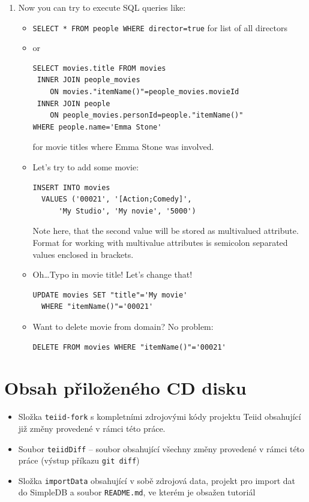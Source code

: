 \documentclass[oneside,12pt,final]{fithesis2}
\begin{document}
\begin{enumerate}
\begin{enumerate}
\item Now you can try to execute SQL queries like:
\begin{itemize}
 \item \texttt{SELECT * FROM people WHERE director=true} for list of all directors
 \item or
 \begin{Verbatim}[fontsize=\small]
SELECT movies.title FROM movies 
 INNER JOIN people_movies 
    ON movies."itemName()"=people_movies.movieId 
 INNER JOIN people 
    ON people_movies.personId=people."itemName()" 
WHERE people.name='Emma Stone'
 \end{Verbatim}
for movie titles where Emma Stone was involved.
\item Let's try to add some movie:
 \begin{Verbatim}[fontsize=\small]
INSERT INTO movies 
  VALUES ('00021', '[Action;Comedy]', 
	  'My Studio', 'My novie', '5000')
 \end{Verbatim}
 Note here, that the second value will be stored as multivalued attribute. Format for working with multivalue attributes is semicolon separated values enclosed in brackets.
 \item Oh\dots Typo in movie title! Let's change that!
  \begin{Verbatim}[fontsize=\small]
UPDATE movies SET "title"='My movie' 
  WHERE "itemName()"='00021'
 \end{Verbatim}
 \item Want to delete movie from domain? No problem:
   \begin{Verbatim}[fontsize=\small]
DELETE FROM movies WHERE "itemName()"='00021'
 \end{Verbatim}
\end{itemize}


\end{enumerate}


\end{enumerate}

\chapter{Obsah přiloženého CD disku}
\begin{itemize}
 \item Složka \texttt{teiid-fork} s kompletními zdrojovými kódy projektu Teiid obsahující již změny provedené v rámci této práce.
 \item Soubor \texttt{teiidDiff} -- soubor obsahující všechny změny provedené v rámci této práce (výstup příkazu \texttt{git diff})
 \item Složka \texttt{importData} obsahující v sobě zdrojová data, projekt pro import dat do SimpleDB a soubor \texttt{README.md}, ve kterém je obsažen tutoriál
\end{itemize}
\end{document}
